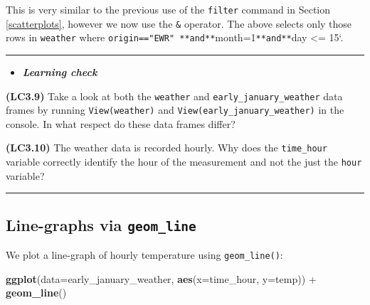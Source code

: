 \documentclass[]{tufte-book}
\newenvironment{Shaded}{\begin{snugshade}}{\end{snugshade}}
\newcommand{\KeywordTok}[1]{\textcolor[rgb]{0.13,0.29,0.53}{\textbf{{#1}}}}
\newcommand{\DataTypeTok}[1]{\textcolor[rgb]{0.13,0.29,0.53}{{#1}}}
\newcommand{\DecValTok}[1]{\textcolor[rgb]{0.00,0.00,0.81}{{#1}}}
\newcommand{\StringTok}[1]{\textcolor[rgb]{0.31,0.60,0.02}{{#1}}}
\newcommand{\NormalTok}[1]{{#1}}
\let\oldrule=\rule
\renewcommand{\rule}[1]{\oldrule{\linewidth}}
\newenvironment{rmdblock}[1]
  {\begin{shaded*}
  \begin{itemize}
  \renewcommand{\labelitemi}{
    \raisebox{-.7\height}[0pt][0pt]{
    }
  }
  \item
  }
  {
  \end{itemize}
  \end{shaded*}
  }
\newenvironment{learncheck}
  {\begin{rmdblock}{warning}}
  {\end{rmdblock}}
\begin{document}
\begin{Shaded}
\end{Shaded}

This is very similar to the previous use of the \texttt{filter} command
in Section \ref{scatterplots}, however we now use the \texttt{\&}
operator. The above selects only those rows in \texttt{weather} where
\texttt{origin=="EWR"\ **and**}month=1\texttt{**and**}day \textless{}=
15`.

\begin{center}\rule{0.5\linewidth}{\linethickness}\end{center}

\begin{learncheck}
\textbf{\emph{Learning check}}
\end{learncheck}

\textbf{(LC3.9)} Take a look at both the \texttt{weather} and
\texttt{early\_january\_weather} data frames by running
\texttt{View(weather)} and \texttt{View(early\_january\_weather)} in the
console. In what respect do these data frames differ?

\textbf{(LC3.10)} The weather data is recorded hourly. Why does the
\texttt{time\_hour} variable correctly identify the hour of the
measurement and not the just the \texttt{hour} variable?

\begin{center}\rule{0.5\linewidth}{\linethickness}\end{center}

\subsection{\texorpdfstring{Line-graphs via
\texttt{geom\_line}}{Line-graphs via geom\_line}}\label{line-graphs-via-geom_line}

We plot a line-graph of hourly temperature using \texttt{geom\_line()}:

\begin{Shaded}
\begin{Highlighting}[]
\KeywordTok{ggplot}\NormalTok{(}\DataTypeTok{data=}\NormalTok{early_january_weather, }\KeywordTok{aes}\NormalTok{(}\DataTypeTok{x=}\NormalTok{time_hour, }\DataTypeTok{y=}\NormalTok{temp)) +}
\StringTok{  }\KeywordTok{geom_line}\NormalTok{()}
\end{Highlighting}
\end{Shaded}
\end{document}

